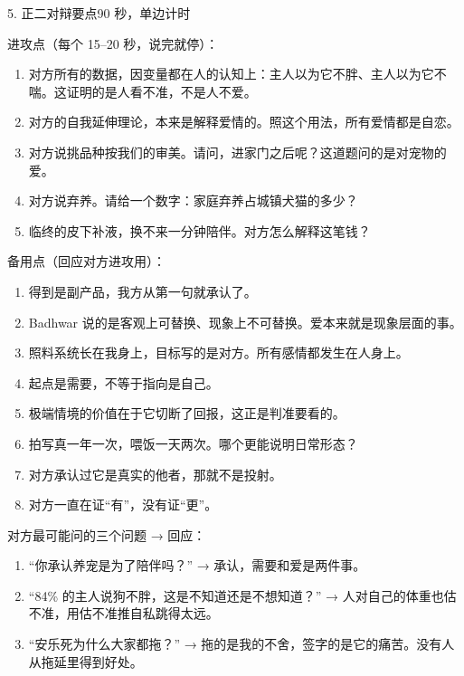 \documentclass[script,pro]{debate}
\begin{document}
\begin{stage}{5. 正二对辩要点}{90 秒，单边计时}
\begin{bullets}
\item 进攻点（每个 15–20 秒，说完就停）：
\begin{enumerate}[leftmargin=1.8em,itemsep=2pt,topsep=2pt]
\item 对方所有的数据，因变量都在人的认知上：主人以为它不胖、主人以为它不喘。这证明的是人看不准，不是人不爱。
\item 对方的自我延伸理论，本来是解释爱情的。照这个用法，所有爱情都是自恋。
\item 对方说挑品种按我们的审美。请问，进家门之后呢？这道题问的是对宠物的爱。
\item 对方说弃养。请给一个数字：家庭弃养占城镇犬猫的多少？
\item 临终的皮下补液，换不来一分钟陪伴。对方怎么解释这笔钱？
\end{enumerate}
\item 备用点（回应对方进攻用）：
\begin{enumerate}[leftmargin=1.8em,itemsep=2pt,topsep=2pt]
\item 得到是副产品，我方从第一句就承认了。
\item Badhwar 说的是客观上可替换、现象上不可替换。爱本来就是现象层面的事。
\item 照料系统长在我身上，目标写的是对方。所有感情都发生在人身上。
\item 起点是需要，不等于指向是自己。
\item 极端情境的价值在于它切断了回报，这正是判准要看的。
\item 拍写真一年一次，喂饭一天两次。哪个更能说明日常形态？
\item 对方承认过它是真实的他者，那就不是投射。
\item 对方一直在证“有”，没有证“更”。
\end{enumerate}
\item 对方最可能问的三个问题 → 回应：
\begin{enumerate}[leftmargin=1.8em,itemsep=2pt,topsep=2pt]
\item “你承认养宠是为了陪伴吗？” → 承认，需要和爱是两件事。
\item “84\% 的主人说狗不胖，这是不知道还是不想知道？” → 人对自己的体重也估不准，用估不准推自私跳得太远。
\item “安乐死为什么大家都拖？” → 拖的是我的不舍，签字的是它的痛苦。没有人从拖延里得到好处。
\end{enumerate}
\end{bullets}
\end{stage}
\end{document}
